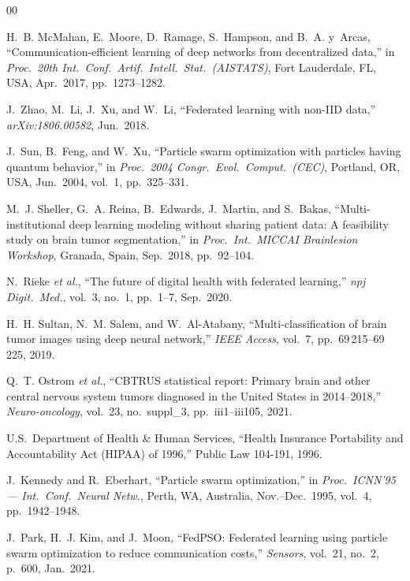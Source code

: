 \documentclass[conference]{IEEEtran}
\begin{document}
\begin{thebibliography}{00}

H.~B. McMahan, E.~Moore, D.~Ramage, S.~Hampson, and B.~A. y~Arcas,
``Communication-efficient learning of deep networks from decentralized data,''
in \textit{Proc.\ 20th Int.\ Conf.\ Artif.\ Intell.\ Stat.\ (AISTATS)},
Fort Lauderdale, FL, USA, Apr.\ 2017, pp.~1273--1282.

J.~Zhao, M.~Li, J.~Xu, and W.~Li,
``Federated learning with non-IID data,''
\textit{arXiv:1806.00582}, Jun.\ 2018.

J.~Sun, B.~Feng, and W.~Xu,
``Particle swarm optimization with particles having quantum behavior,''
in \textit{Proc.\ 2004 Congr.\ Evol.\ Comput.\ (CEC)}, Portland, OR, USA,
Jun.\ 2004, vol.~1, pp.~325--331.

M.~J. Sheller, G.~A. Reina, B.~Edwards, J.~Martin, and S.~Bakas,
``Multi-institutional deep learning modeling without sharing patient data:
A feasibility study on brain tumor segmentation,''
in \textit{Proc.\ Int.\ MICCAI Brainlesion Workshop}, Granada, Spain,
Sep.\ 2018, pp.~92--104.

N.~Rieke \textit{et al.},
``The future of digital health with federated learning,''
\textit{npj Digit.\ Med.}, vol.~3, no.~1, pp.~1--7, Sep.\ 2020.

H.~H. Sultan, N.~M. Salem, and W.~Al-Atabany,
``Multi-classification of brain tumor images using deep neural network,''
\textit{IEEE Access}, vol.~7, pp.~69\,215--69\,225, 2019.

Q.~T. Ostrom \textit{et al.},
``CBTRUS statistical report: Primary brain and other central nervous system
tumors diagnosed in the United States in 2014--2018,''
\textit{Neuro-oncology}, vol.~23, no.~suppl\_3, pp.~iii1--iii105, 2021.

U.S.\ Department of Health \& Human Services,
``Health Insurance Portability and Accountability Act (HIPAA) of 1996,''
Public Law 104-191, 1996.

J.~Kennedy and R.~Eberhart,
``Particle swarm optimization,''
in \textit{Proc.\ ICNN'95 --- Int.\ Conf.\ Neural Netw.}, Perth, WA,
Australia, Nov.--Dec.\ 1995, vol.~4, pp.~1942--1948.

J.~Park, H.~J. Kim, and J.~Moon,
``FedPSO: Federated learning using particle swarm optimization to
reduce communication costs,''
\textit{Sensors}, vol.~21, no.~2, p.~600, Jan.\ 2021.


\end{thebibliography}
\end{document}
